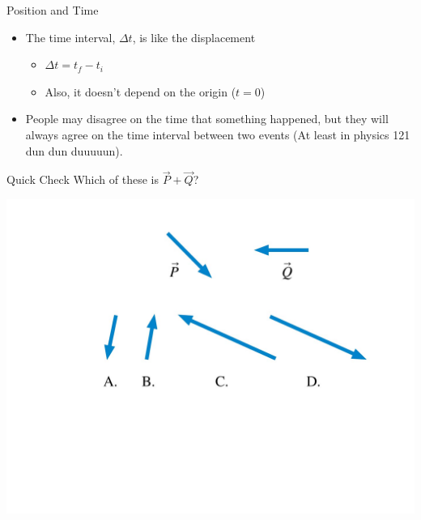 \documentclass{beamer}
\newcommand{\red}[1]{{\color{red}{#1}}}
\newcommand{\checkH}[2]{\begin{textblock*}{1cm}(#1,#2){\Huge \red{\Checkmark}}\end{textblock*}}
\begin{document}
\begin{frame}{Position and Time}
\begin{itemize}
   \item The time interval, $\Delta t$, is like the displacement
   \begin{itemize}
      \item $\Delta t = t_f-t_i$
      \item Also, it doesn't depend on the origin ($t=0$)
   \end{itemize}
   \item People may disagree on the time that something happened, but they will always agree on the time interval between two events (At least in physics 121 dun dun duuuuun).
\end{itemize}
\end{frame}

\begin{frame}{Quick Check}
Which of these is $\vec{P}+\vec{Q}$?
\begin{center}
   \includegraphics[width=1\textwidth]{../figures/QC1_3.jpg}
\end{center}
\only<2>{\checkH{3.3cm}{6.2cm}}
\end{frame}
\end{document}
